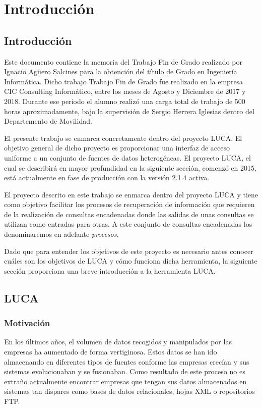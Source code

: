 \chapter{Introducción}

\minitoc
	
\section{Introducción}

Este documento contiene la memoria del Trabajo Fin de Grado realizado por Ignacio Agüero Salcines para la obtención del título de Grado en Ingeniería Informática. Dicho trabajo Trabajo Fin de Grado fue realizado en la empresa CIC Consulting Informático, entre los meses de Agosto y Diciembre de 2017 y 2018. Durante ese periodo el alumno realizó una carga total de trabajo de 500 horas aproximadamente, bajo la supervisión de Sergio Herrera Iglesias dentro del Departemento de Movilidad.

El presente trabajo se enmarca concretamente dentro del proyecto LUCA. El objetivo general de dicho proyecto es proporcionar una interfaz de acceso uniforme a un conjunto de fuentes de datos heterogéneas. El proyecto LUCA, el cual se describirá en mayor profundidad en la siguiente sección, comenzó en 2015, está actualmente en fase de producción con la versión 2.1.4 activa.

El proyecto descrito en este trabajo se enmarca dentro del proyecto LUCA y tiene como objetivo facilitar los procesos de recuperación de información que requieren de la realización de consultas encadenadas donde las salidas de unas consultas se utilizan como entradas para otras. A este conjunto de consultas encadenadas los denominaremos en adelante \emph{procesos}. 

Dado que para entender los objetivos de este proyecto es necesario antes conocer cuáles son los objetivos de LUCA y cómo funciona dicha herramienta, la siguiente sección proporciona una breve introducción a la herramienta LUCA.

\section{LUCA}

\subsection{Motivación}

En los últimos años, el volumen de datos recogidos y manipulados por las empresas ha aumentado de forma vertiginosa. Estos datos se han ido almacenando en diferentes tipos de fuentes conforme las empresas crecían y sus sistemas evolucionaban y se fusionaban. Como resultado de  este proceso no es extraño actualmente encontrar empresas que tengan sus datos almacenados en sistemas tan dispares como bases de datos relacionales, hojas XML o repositorios FTP.

